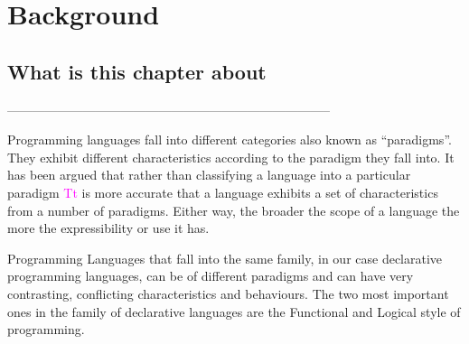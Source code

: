 \documentclass[thesis-solanki.tex]{subfiles}
\begin{document}
\chapter{Background}\label{chap:background}

\section{What is this chapter about}

-----------------------------------------------------------------------------

Programming languages fall into different categories also known as ``paradigms''.
They exhibit different characteristics according to the paradigm they fall into.
It has been argued \cite{Krishnamurthi:2008:TPL:1480828.1480846} that
rather than classifying a language into a particular paradigm
\textcolor{fuchsia}{Tt}
is
more accurate that a language exhibits a set of characteristics from a
number of paradigms.
Either way, the broader the scope of a language the more the
expressibility or use it has.

Programming Languages that fall into the same family, in our case declarative programming languages, can be of
different paradigms and can have very contrasting, conflicting characteristics and behaviours.
The two most important ones in the family of declarative languages are the Functional and Logical style of
programming.
\end{document}
